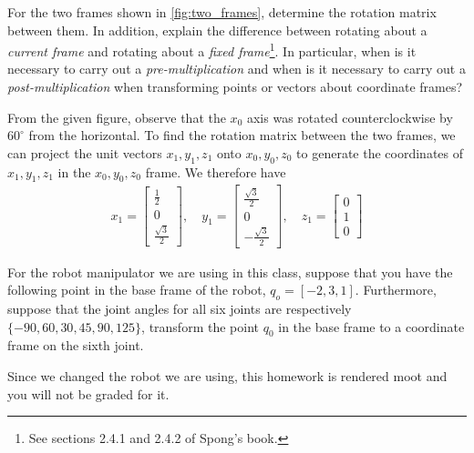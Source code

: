 \noindent 
\begin{homework}
	For the two frames shown in \autoref{fig:two_frames}, determine the rotation matrix between them. In addition, explain the difference between rotating about a \textit{current frame} and rotating about a \textit{fixed frame}\footnote{See sections 2.4.1 and 2.4.2 of Spong's book.}. In particular, when is it necessary to carry out a \textit{pre-multiplication} and when is it necessary to carry out a \textit{post-multiplication} when transforming points or vectors about coordinate frames?
\end{homework}

\begin{solution}
	From the given figure, observe that the $x_0$ axis was rotated counterclockwise by $60^\circ$ from the horizontal. To find the rotation matrix between the two frames, we can project the unit vectors $x_1, y_1, z_1$ onto $x_0, y_0, z_0$ to generate the coordinates of $x_1, y_1, z_1$ in the $x_0, y_0, z_0$ frame. We therefore have
	\begin{align}
		x_1 = \begin{bmatrix}
		\frac{1}{2} 
		\\
		0
		\\
		\frac{\sqrt{3}}{2}
		\end{bmatrix}, \quad
		y_1 = \begin{bmatrix}
		\frac{\sqrt{3}}{2}
		\\
		0
		\\
		-\frac{\sqrt{3}}{2}
		\end{bmatrix},  \quad
		z_1 = \begin{bmatrix}
		0
		\\
		1
		\\
		0
		\end{bmatrix}
	\end{align}
\end{solution}


\noindent 
\begin{homework}
	For the robot manipulator we are using in this class, suppose that you have the following point in the base frame of the robot, $q_o = [-2, 3, 1]$. Furthermore, suppose that the joint angles for all six joints are respectively $\{-90, 60, 30, 45, 90, 125 \}$, transform the point $q_0$ in the base frame to a coordinate frame on the sixth joint.
\end{homework}

\begin{solution}
Since we changed the robot we are using, this homework is rendered moot and you will not be graded for it.
\end{solution}

